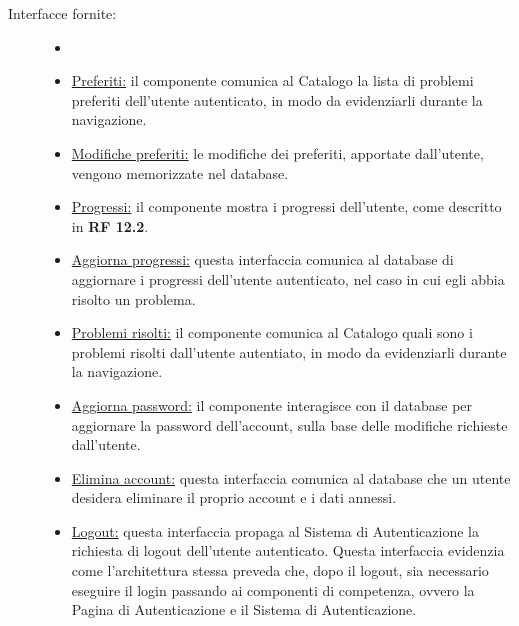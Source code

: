 \documentclass[11pt, a4paper]{article}
\theoremstyle{definition} %
\begin{document}
\begin{description}
    \item[Interfacce fornite:]
    \begin{itemize}
        \item[]

        \item \underline{Preferiti:} il componente comunica al Catalogo la
        lista di problemi preferiti dell'utente autenticato, in modo da
        evidenziarli durante la navigazione.

        \item \underline{Modifiche preferiti:} le modifiche dei preferiti,
        apportate dall'utente, vengono memorizzate nel database.

        \item \underline{Progressi:} il componente mostra i progressi dell'utente,
        come descritto in \textbf{RF 12.2}.

        \item \underline{Aggiorna progressi:} questa interfaccia comunica al
        database di aggiornare i progressi dell'utente autenticato, nel caso
        in cui egli abbia risolto un problema.

        \item \underline{Problemi risolti:} il componente comunica al Catalogo
        quali sono i problemi risolti dall'utente autentiato, in modo da
        evidenziarli durante la navigazione.

        \item \underline{Aggiorna password:} il componente interagisce con
        il database per aggiornare la password dell'account, sulla base delle
        modifiche richieste dall'utente.

        \item \underline{Elimina account:} questa interfaccia comunica al
        database che un utente desidera eliminare il proprio account e i
        dati annessi.
        
        \item \underline{Logout:} questa interfaccia propaga al
        Sistema di Autenticazione la richiesta di logout dell'utente autenticato.
        Questa interfaccia evidenzia come l'architettura stessa preveda che,
        dopo il logout, sia necessario eseguire il login passando ai componenti
        di competenza, ovvero la Pagina di Autenticazione e il Sistema di Autenticazione.
    \end{itemize}
\end{description}
\end{document}
